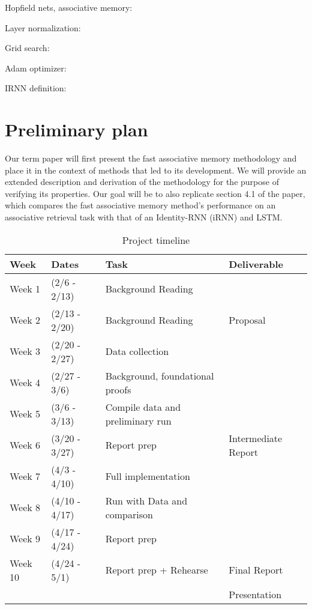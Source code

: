 Hopfield nets, associative memory: \cite{Mackay03informationtheory}

Layer normalization: \cite{1607.06450}

Grid search: \cite{Goodfellow-et-al-2016}

Adam optimizer: \cite{1412.6980}

IRNN definition: \cite{1511.03771}

\section{Preliminary plan}

Our term paper will first present the fast associative memory methodology and place it in the context of methods that led to its development. We will provide an extended description and derivation of the methodology for the purpose of verifying its properties. Our goal will be to also replicate section 4.1 of the paper, which compares the fast associative memory method's performance on an associative retrieval task with that of an Identity-RNN (iRNN) and LSTM.


\begin{table*}[t]
  \caption{Project timeline}
  \label{tab:freq}
  \begin{tabular}{llll}
    \toprule
    Week & Dates & Task & Deliverable\\
    \midrule
    Week 1 & (2/6   - 2/13) & Background Reading & \\
    Week 2 & (2/13  - 2/20) & Background Reading & Proposal\\
    Week 3 & (2/20  - 2/27) & Data collection & \\
    Week 4 & (2/27  - 3/6)  & Background, foundational proofs & \\
    Week 5 & (3/6   - 3/13) & Compile data and preliminary run & \\
    Week 6 & (3/20  - 3/27) & Report prep & Intermediate Report\\
    Week 7 & (4/3   - 4/10) & Full implementation & \\
    Week 8 & (4/10  - 4/17) & Run with Data and comparison & \\
    Week 9 & (4/17  - 4/24) & Report prep & \\
    Week 10 & (4/24 - 5/1) & Report prep + Rehearse & Final Report \\
    & & & Presentation\\
  \bottomrule
\end{tabular}
\end{table*}
